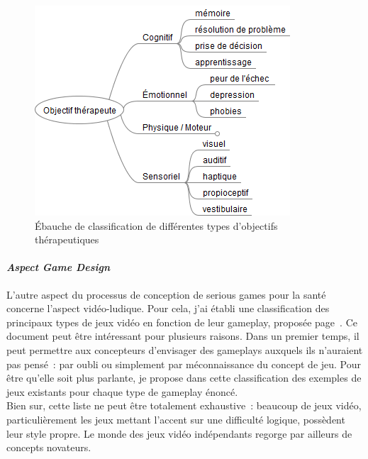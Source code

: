 \begin{figure}[hbtp]
	\centering
	\includegraphics[scale=0.7]{images/objectifs_autres}
	\caption{Ébauche de classification de différentes types d'objectifs thérapeutiques}
	\label{objectifs_autres}
\end{figure}

			\paragraph{\emph{Aspect Game Design}\\}
L'autre aspect du processus de conception de serious games pour la santé concerne l'aspect vidéo-ludique. Pour cela, j'ai établi une classification des principaux types de jeux vidéo en fonction de leur gameplay, proposée page~\pageref{types_jeux}. Ce document peut être intéressant pour plusieurs raisons. Dans un premier temps, il peut permettre aux concepteurs d'envisager des gameplays auxquels ils n'auraient pas pensé~: par oubli ou simplement par méconnaissance du concept de jeu. Pour être qu'elle soit plus parlante, je propose dans cette classification des exemples de jeux existants pour chaque type de gameplay énoncé. \\
Bien sur, cette liste ne peut être totalement exhaustive~: beaucoup de jeux vidéo, particulièrement les jeux mettant l'accent sur une difficulté logique, possèdent leur style propre. Le monde des jeux vidéo indépendants regorge par ailleurs de concepts novateurs.


